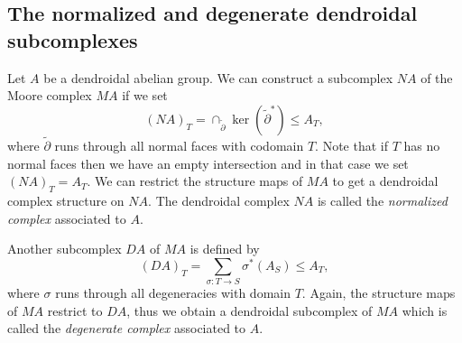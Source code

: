 \documentclass[a4paper]{amsart}
\theoremstyle{plain}
\theoremstyle{definition}
\theoremstyle{remark}
\numberwithin{equation}{section}
\numberwithin{figure}{section}
\begin{document}
\subsection{The normalized and degenerate dendroidal subcomplexes}
Let $A$ be a dendroidal abelian group. We can construct a subcomplex $NA$ of the Moore complex $MA$ if we
set
\[
    (NA)_T=\cap_{\tilde\partial}\ker(\tilde\partial^*)\leq A_T,
\]
where $\tilde\partial$ runs through all normal faces with codomain
$T$. Note that if $T$ has no normal faces then we have an empty
intersection and in that case we set $(NA)_T=A_T$. We can restrict
the structure maps of $MA$ to get a dendroidal complex structure on
$NA$. The dendroidal complex $NA$ is called the \emph{normalized
    complex} associated to $A$.

Another  subcomplex $DA$ of $MA$ is defined by
\[
    (DA)_T=\!\!\!\!\!\sum_{\sigma\colon T\rightarrow S}\!\!\!\!\sigma^*(A_S)\leq A_T,
\]
where $\sigma$ runs through all degeneracies with domain $T$. Again, the structure maps of $MA$
restrict to $DA$, thus we obtain a dendroidal subcomplex of $MA$ which is called the \emph{degenerate
    complex} associated to $A$.
\end{document}
